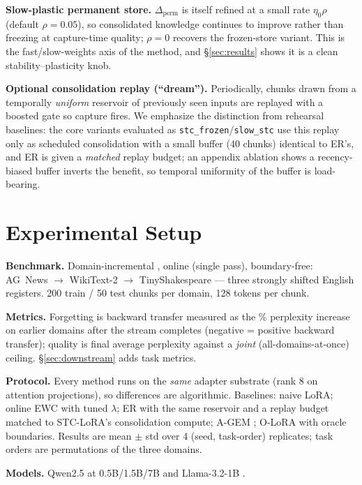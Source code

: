 \documentclass{article}
\newcommand{\stc}{STC-LoRA}
\begin{document}
\textbf{Slow-plastic permanent store.} $\Delta_{\mathrm{perm}}$ is itself refined at a small rate $\eta_0\rho$ (default $\rho{=}0.05$), so consolidated knowledge continues to improve rather than freezing at capture-time quality; $\rho{=}0$ recovers the frozen-store variant. This is the fast/slow-weights axis of the method, and \S\ref{sec:results} shows it is a clean stability--plasticity knob.

\textbf{Optional consolidation replay (``dream'').} Periodically, chunks drawn from a temporally \emph{uniform} reservoir \citep{vitter1985random} of previously seen inputs are replayed with a boosted gate so capture fires. We emphasize the distinction from rehearsal baselines: the core variants evaluated as \texttt{stc\_frozen}/\texttt{slow\_stc} use this replay only as scheduled consolidation with a small buffer (40 chunks) identical to ER's, and ER is given a \emph{matched} replay budget; an appendix ablation shows a recency-biased buffer inverts the benefit, so temporal uniformity of the buffer is load-bearing.

\section{Experimental Setup}\label{sec:setup}
\textbf{Benchmark.} Domain-incremental \citep{vandeven2022three}, online (single pass), boundary-free: AG~News $\rightarrow$ WikiText-2 $\rightarrow$ TinyShakespeare --- three strongly shifted English registers. 200 train / 50 test chunks per domain, 128 tokens per chunk.

\textbf{Metrics.} Forgetting is backward transfer measured as the \% perplexity increase on earlier domains after the stream completes (negative = positive backward transfer); quality is final average perplexity against a \emph{joint} (all-domains-at-once) ceiling. \S\ref{sec:downstream} adds task metrics.

\textbf{Protocol.} Every method runs on the \emph{same} adapter substrate (rank 8 on attention projections), so differences are algorithmic. Baselines: naive LoRA; online EWC \citep{schwarz2018progress} with tuned $\lambda$; ER with the same reservoir and a replay budget matched to \stc{}'s consolidation compute; A-GEM \citep{chaudhry2019efficient}; O-LoRA \citep{wang2023orthogonal} with oracle boundaries. Results are mean $\pm$ std over 4 (seed, task-order) replicates; task orders are permutations of the three domains.

\textbf{Models.} Qwen2.5 at 0.5B/1.5B/7B \citep{qwen2025} and Llama-3.2-1B \citep{grattafiori2024llama}.
\end{document}
